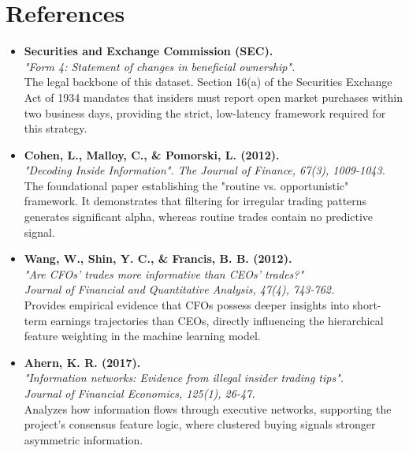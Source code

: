 \documentclass{article}
\begin{document}
\section{References}
    \begin{itemize}
        \setlength\itemsep{1em}
        
        \item \textbf{Securities and Exchange Commission (SEC).} \\
        \textit{"Form 4: Statement of changes in beneficial ownership".} \\
        \small The legal backbone of this dataset. Section 16(a) of the Securities Exchange Act of 1934 mandates that insiders must report open market purchases within two business days, providing the strict, low-latency framework required for this strategy.

        \item \textbf{Cohen, L., Malloy, C., \& Pomorski, L. (2012).} \\
        \textit{"Decoding Inside Information". The Journal of Finance, 67(3), 1009-1043.} \\
        \small The foundational paper establishing the "routine vs. opportunistic" framework. It demonstrates that filtering for irregular trading patterns generates significant alpha, whereas routine trades contain no predictive signal.

        \item \textbf{Wang, W., Shin, Y. C., \& Francis, B. B. (2012).} \\
        \textit{"Are CFOs' trades more informative than CEOs' trades?"} \\
        \small \textit{Journal of Financial and Quantitative Analysis, 47(4), 743-762.} \\
        \small Provides empirical evidence that CFOs possess deeper insights into short-term earnings trajectories than CEOs, directly influencing the hierarchical feature weighting in the machine learning model.
        
        \item \textbf{Ahern, K. R. (2017).} \\
        \textit{"Information networks: Evidence from illegal insider trading tips".} \\
        \small \textit{Journal of Financial Economics, 125(1), 26-47.} \\
        \small Analyzes how information flows through executive networks, supporting the project's consensus feature logic, where clustered buying signals stronger asymmetric information.


\end{itemize}
\end{document}
